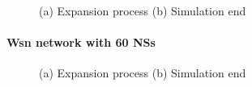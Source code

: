 \begin{figure}[H]
    \centering
    \caption{(a) Expansion process (b) Simulation end}
    \label{fig:foobar}
\end{figure}

\paragraph{Wsn network with 60 NSs}

\begin{figure}[H]
    \centering
    \caption{(a) Expansion process (b) Simulation end}
    \label{fig:foobar}
\end{figure}

